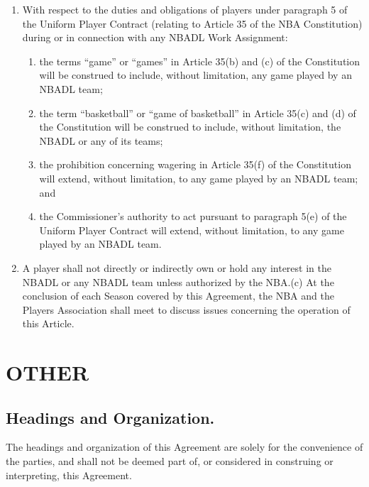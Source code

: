\documentclass[
]{book}
\providecommand{\tightlist}{%
  \setlength{\itemsep}{0pt}\setlength{\parskip}{0pt}}
\begin{document}
\begin{enumerate}
\def\labelenumi{(\alph{enumi})}
\tightlist
\item
  With respect to the duties and obligations of players under paragraph 5 of the Uniform Player Contract (relating to Article 35 of the NBA Constitution) during or in connection with any NBADL Work Assignment:

  \begin{enumerate}
  \def\labelenumii{(\roman{enumii})}
  \tightlist
  \item
    the terms ``game'' or ``games'' in Article 35(b) and (c) of the Constitution will be construed to include, without limitation, any game played by an NBADL team;
  \item
    the term ``basketball'' or ``game of basketball'' in Article 35(c) and (d) of the Constitution will be construed to include, without limitation, the NBADL or any of its teams;
  \item
    the prohibition concerning wagering in Article 35(f) of the Constitution will extend, without limitation, to any game played by an NBADL team; and
  \item
    the Commissioner's authority to act pursuant to paragraph 5(e) of the Uniform Player Contract will extend, without limitation, to any game played by an NBADL team.
  \end{enumerate}
\item
  A player shall not directly or indirectly own or hold any interest in the NBADL or any NBADL team unless authorized by the NBA.(c) At the conclusion of each Season covered by this Agreement, the NBA and the Players Association shall meet to discuss issues concerning the operation of this Article.
\end{enumerate}

\hypertarget{other}{%
\chapter{OTHER}\label{other}}

\hypertarget{headings-and-organization.}{%
\section{Headings and Organization.}\label{headings-and-organization.}}

The headings and organization of this Agreement are solely for the convenience of the parties, and shall not be deemed part of, or considered in construing or interpreting, this Agreement.
\end{document}
